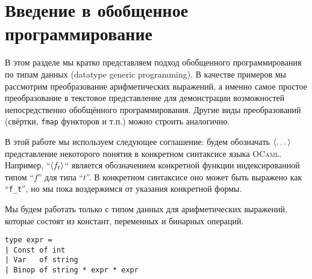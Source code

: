 \section{Введение в обобщенное программирование }
\label{sec:tutorial}


В этом разделе мы кратко представляем  подход обобщенного программирования по типам данных (datatype generic programming). В качестве примеров мы рассмотрим преобразование арифметических выражений, а именно самое простое преобразование в текстовое представление для демонстрации возможностей непосредственно обобщённого программирования. 
Другие виды преобразований (свёртки, \verb=fmap= функторов и т.п.) можно строить аналогично.




В этой работе мы используем следующее соглашение: будем обозначать $\left<\dots\right>$ представление некоторого понятия в конкретном синтаксисе языка \textsc{OCaml}. Например, ``$\left<f_t\right>$`` является обозначением конкретной функции индексированной типом  ``$f$'' для типа ``$t$''. 
В конкретном синтаксисе оно может быть выражено как ``\lstinline{f_t}'', но мы пока воздержимся от указания конкретной формы.



Мы будем работать только с типом данных для арифметических выражений, которые состоят из констант, переменных и бинарных операций.

\begin{lstlisting}
type expr =
| Const of int
| Var   of string
| Binop of string * expr * expr
\end{lstlisting}


